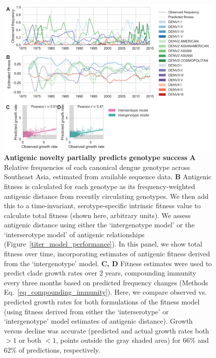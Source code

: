 \documentclass[11pt,oneside,letterpaper]{article}
\begin{document}
\begin{figure}[ht]
  \begin{centering}
\includegraphics[width=\linewidth]{../figures/png/genotype-fitness.png}
    \caption{\textbf{Antigenic novelty partially predicts genotype success }
    \textbf{A} Relative frequencies of each canonical dengue genotype across Southeast Asia, estimated from available sequence data.
    \textbf{B} Antigenic fitness is calculated for each genotype as its frequency-weighted antigenic distance from recently circulating genotypes.
    We then add this to a time-invariant, serotype-specific intrinsic fitness value to calculate total fitness (shown here, arbitrary units).
    We assess antigenic distance using either the `intergenotype model' or the `interserotype model' of antigenic relationships (Figure~\ref{titer_model_performance}).
    In this panel, we show total fitness over time, incorporating estimates of antigenic fitness derived from the `intergenotype' model.
    \textbf{C, D}  Fitness estimates were used to predict clade growth rates over 2 years, compounding immunity every three months based on predicted frequency changes (Methods Eq.~\ref{eq_compounding_immunity}).
    Here, we compare observed vs. predicted growth rates for both formulations of the fitness model (using fitness derived from either the `interserotype' or `intergenotype' model estimates of antigenic distance).
    Growth versus decline was accurate (predicted and actual growth rates both $> 1$ or both $< 1$, points outside the gray shaded area) for 66\% and 62\% of predictions, respectively.
}
     \label{genotype_fitness}
   \end{centering}
\end{figure}
\end{document}
